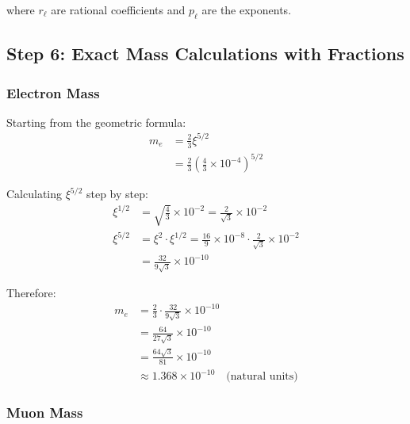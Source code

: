 \documentclass[12pt,a4paper]{article}
\newcommand{\xipar}{\xi}  %
\begin{document}
	where $r_{\ell}$ are rational coefficients and $p_{\ell}$ are the exponents.
	
	\subsection{Step 6: Exact Mass Calculations with Fractions}
	
	\subsubsection{Electron Mass}
	
	\begin{keyresult}
		Starting from the geometric formula:
		\begin{align}
			m_e &= \frac{2}{3} \xipar^{5/2} \\
			&= \frac{2}{3} \left(\frac{4}{3} \times 10^{-4}\right)^{5/2}
		\end{align}
		
		Calculating $\xipar^{5/2}$ step by step:
		\begin{align}
			\xipar^{1/2} &= \sqrt{\frac{4}{3}} \times 10^{-2} = \frac{2}{\sqrt{3}} \times 10^{-2} \\
			\xipar^{5/2} &= \xipar^2 \cdot \xipar^{1/2} = \frac{16}{9} \times 10^{-8} \cdot \frac{2}{\sqrt{3}} \times 10^{-2} \\
			&= \frac{32}{9\sqrt{3}} \times 10^{-10}
		\end{align}
		
		Therefore:
		\begin{align}
			m_e &= \frac{2}{3} \cdot \frac{32}{9\sqrt{3}} \times 10^{-10} \\
			&= \frac{64}{27\sqrt{3}} \times 10^{-10} \\
			&= \frac{64\sqrt{3}}{81} \times 10^{-10} \\
			&\approx 1.368 \times 10^{-10} \quad \text{(natural units)}
		\end{align}
	\end{keyresult}
	
	\subsubsection{Muon Mass}
	
\end{document}
